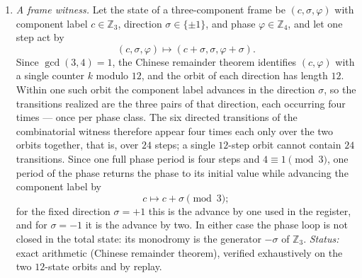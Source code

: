 \begin{enumerate}
  \item \emph{A frame witness.}  Let the state of a three-component frame be
  $(c,\sigma,\varphi)$ with component label $c\in\mathbb Z_3$, direction
  $\sigma\in\{\pm1\}$, and phase $\varphi\in\mathbb Z_4$, and let one step act by
  \[
    (c,\sigma,\varphi)\longmapsto(c+\sigma,\sigma,\varphi+\sigma).
  \]
  Since $\gcd(3,4)=1$, the Chinese remainder theorem identifies
  $(c,\varphi)$ with a single counter $k$ modulo $12$, and the orbit of each
  direction has length $12$.  Within one such orbit the component label
  advances in the direction $\sigma$, so the transitions realized are the three
  pairs of that direction, each occurring four times --- once per phase class.
  The six directed transitions of the combinatorial witness therefore appear
  four times each only over the two orbits together, that is, over $24$ steps;
  a single $12$-step orbit cannot contain $24$ transitions.  Since one full
  phase period is four steps and $4\equiv1\pmod3$, one period of the phase
  returns the phase to its initial value while advancing the component label by
  \[
    c\longmapsto c+\sigma \pmod 3 ;
  \]
  for the fixed direction $\sigma=+1$ this is the advance by one used in the
  register, and for $\sigma=-1$ it is the advance by two.  In either case the
  phase loop is not closed in the total state: its monodromy is the generator
  $-\sigma$ of $\mathbb Z_3$.  \emph{Status:} exact arithmetic (Chinese
  remainder theorem), verified exhaustively on the two $12$-state orbits and by
  replay.


\end{enumerate}
